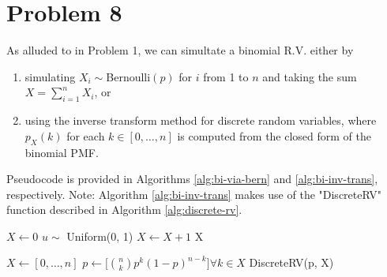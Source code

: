\documentclass{homework}
\begin{document}
\section{Problem 8}
As alluded to in Problem 1, we can simultate a binomial R.V. either
by
\begin{enumerate}
    \item simulating $X_i \sim $Bernoulli$(p)$ for $i$ from 1 to $n$ and taking
        the sum $X = \sum_{i=1}^n X_i$, or
    \item using the inverse transform method for discrete random variables,
        where $p_X(k)$ for each $k\in[0,\dots,n]$ is computed from the closed
        form of the binomial PMF.
\end{enumerate}

Pseudocode is provided in Algorithms \ref{alg:bi-via-bern} and \ref{alg:bi-inv-trans},
respectively. Note: Algorithm \ref{alg:bi-inv-trans} makes use of the "DiscreteRV" function
described in Algorithm \ref{alg:discrete-rv}.

\begin{algorithm}
    \caption{Generate Binomial($n,p$) via Bernoulli trials}\label{alg:bi-via-bern}
\begin{algorithmic}
    \State $X \gets 0$
        \State $u \sim$ Uniform(0, 1)
            \State $X \gets X + 1$
        \EndIf
    \EndFor
    \State \Return X
\end{algorithmic}
\end{algorithm}

\begin{algorithm}
    \caption{Generate Binomial($n,p$) via Inverse transform}\label{alg:bi-inv-trans}
\begin{algorithmic}
    \State $X \gets [0,\dots,n]$
    \State $p \gets \biggl[
        \binom{n}{k} p^k (1-p)^{n-k}
    \biggr] \forall k\in X$
    \State \Return DiscreteRV(p, X)
\end{algorithmic}
\end{algorithm}
\end{document}
